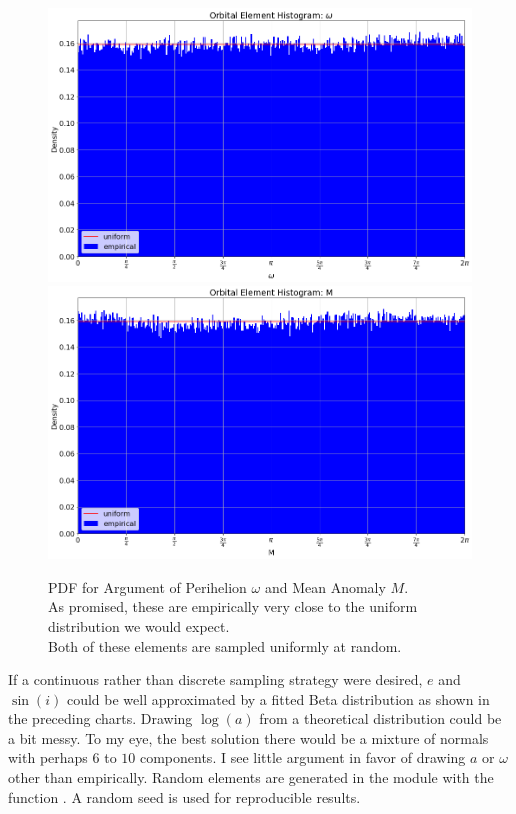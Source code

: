 \begin{figure}[hbt!]
\begin{center}
\includegraphics[width=1.0\textwidth]{../figs/elts/elt_hist_omega_peri.png}
\includegraphics[width=1.0\textwidth]{../figs/elts/elt_hist_M.png}
\end{center}
\caption[PDF for Argument of Perihelion $\omega$ and Mean Anomaly $M$]
{PDF for Argument of Perihelion $\omega$ and Mean Anomaly $M$.\\ 
As promised, these are empirically very close to the uniform distribution we would expect.\\
Both of these elements are sampled uniformly at random.}
\end{figure}
\clearpage

If a continuous rather than discrete sampling strategy were desired, $e$ and $\sin(i)$ could be well approximated by 
a fitted Beta distribution as shown in the preceding charts. 
Drawing $\log(a)$ from a theoretical distribution could be a bit messy.  
To my eye, the best solution there would be a mixture of normals with perhaps $6$ to $10$ components.
I see little argument in favor of drawing $a$ or $\omega$ other than empirically.
Random elements are generated in the module  with the function .
A random seed is used for reproducible results.

